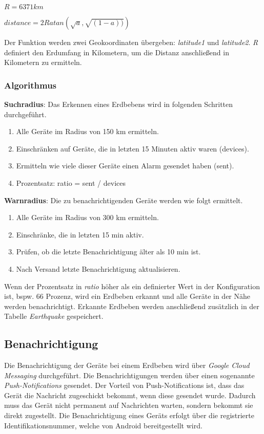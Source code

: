 \begin{math}R = 6371 km\end{math}

\begin{math}distance = 2R atan(\sqrt{a}, \sqrt{(1-a))})\end{math}


Der Funktion werden zwei Geokoordinaten übergeben: \textit{latitude1} und \textit{latitude2}. \textit{R} definiert den Erdumfang in Kilometern, um die Distanz anschließend in Kilometern zu ermitteln.

\subsubsection{Algorithmus}
\textbf{Suchradius}: Das Erkennen eines Erdbebens wird in folgenden Schritten durchgeführt.

\begin{enumerate} 
\item Alle Geräte im Radius von 150 km ermitteln.
\item Einschränken auf Geräte, die in letzten 15 Minuten aktiv waren (devices). 
\item Ermitteln wie viele dieser Geräte einen Alarm gesendet haben (sent).
\item Prozentsatz: ratio = sent / devices
\end{enumerate}

\textbf{Warnradius}: Die zu benachrichtigenden Geräte werden wie folgt ermittelt.

\begin{enumerate} 
\item Alle Geräte im Radius von 300 km ermitteln.
\item Einschränke, die in letzten 15 min aktiv.
\item Prüfen, ob die letzte Benachrichtigung älter als 10 min ist.
\item Nach Versand letzte Benachrichtigung aktualisieren.
\end{enumerate}

Wenn der Prozentsatz in \textit{ratio} höher als ein definierter Wert in der Konfiguration ist, bspw. 66 Prozenz, wird ein Erdbeben erkannt und alle Geräte in der Nähe werden benachrichtigt. Erkannte Erdbeben werden anschließend zusätzlich in der Tabelle \textit{Earthquake} gespeichert.

\subsection{Benachrichtigung}
Die Benachrichtigung der Geräte bei einem Erdbeben wird über \textit{Google Cloud Messaging}  durchgeführt. Die Benachrichtigungen werden über einen sogenannte \textit{Push-Notifications} gesendet. Der Vorteil von Push-Notifications ist, dass das Gerät die Nachricht zugeschickt bekommt, wenn diese gesendet wurde. Dadurch muss das Gerät nicht permanent auf Nachrichten warten, sondern bekommt sie direkt zugestellt. Die Benachrichtigung eines Geräts erfolgt über die registrierte Identifikationsnummer, welche von Android bereitgestellt wird. 

